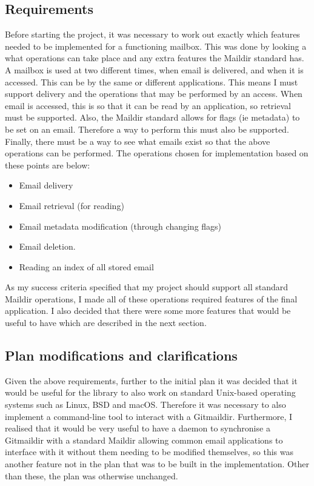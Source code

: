 \subsection{Requirements}

Before starting the project, it was necessary to work out exactly which features needed to be implemented for a functioning mailbox. This was done by looking a what operations can take place and any extra features the Maildir standard has. A mailbox is used at two different times, when email is delivered, and when it is accessed. This can be by the same or different applications. This means I must support delivery and the operations that may be performed by an access. When email is accessed, this is so that it can be read by an application, so retrieval must be supported. Also, the Maildir standard allows for flags (ie metadata) to be set on an email. Therefore a way to perform this must also be supported. Finally, there must be a way to see what emails exist so that the above operations can be performed. The operations chosen for implementation based on these points are below:

\begin{itemize}
  \item Email delivery
  \item Email retrieval (for reading)
  \item Email metadata modification (through changing flags)
  \item Email deletion.
  \item Reading an index of all stored email
\end{itemize}

As my success criteria specified that my project should support all standard Maildir operations, I made all of these operations required features of the final application. I also decided that there were some more features that would be useful to have which are described in the next section.

\subsection{Plan modifications and clarifications}

Given the above requirements, further to the initial plan it was decided that it would be useful for the library to also work on standard Unix-based operating systems such as Linux, BSD and macOS. Therefore it was necessary to also implement a command-line tool to interact with a Gitmaildir. Furthermore, I realised that it would be very useful to have a daemon to synchronise a Gitmaildir with a standard Maildir allowing common email applications to interface with it without them needing to be modified themselves, so this was another feature not in the plan that was to be built in the implementation. Other than these, the plan was otherwise unchanged.

